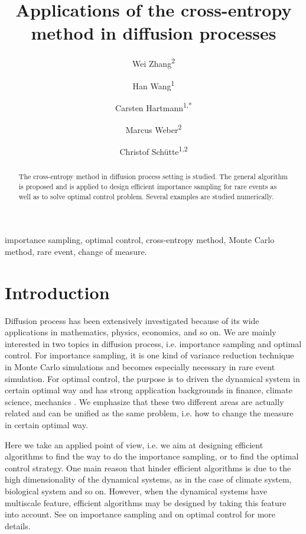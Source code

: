 \documentclass[final]{siamltex}
\begin{document}
\title{Applications of the cross-entropy method in diffusion processes}
\author{Wei Zhang\textsuperscript{2}\and Han Wang\textsuperscript{1} \and
  Carsten Hartmann\textsuperscript{1,*}\and 
Marcus Weber\textsuperscript{2}\and Christof Sch\"{u}tte\textsuperscript{1,2}}
\renewcommand{\thefootnote}{\fnsymbol{footnote}}
\date{}
\maketitle
\begin{abstract}
  The cross-entropy method in diffusion process setting is studied. The
  general algorithm is proposed and is applied to design efficient importance sampling for rare events as well as to solve optimal
  control problem. Several examples are studied numerically.
\end{abstract}
\begin{keywords}
importance sampling, optimal control, cross-entropy method, Monte Carlo
method, rare event, change of measure. 
\end{keywords}
\begin{AMS}
\end{AMS}
\section{Introduction}
\label{intro}
Diffusion process has been extensively investigated because of its wide
applications in mathematics, physics, economics, and so on.
We are mainly interested in two topics in diffusion process, i.e. importance sampling and optimal control. 
For importance sampling, it is one kind of variance reduction technique 
in Monte Carlo simulations and becomes especially necessary in rare event simulation.
For optimal control, the purpose is to driven the dynamical system in certain
optimal way and has strong application backgrounds in finance, climate
science, mechanics \cite{fleming2006}. We emphasize that these two different areas are actually related and can
be unified as the same problem, i.e. how to change the measure in certain optimal way.

Here we take an applied point of view, i.e. we aim at designing efficient
algorithms to find the way to do the importance sampling, or to find the
optimal control strategy. One main reason that hinder efficient algorithms is
due to the high dimensionality of the dynamical systems, as in the case of
climate system, biological system and so on. However, when the dynamical
systems have multiscale feature, efficient algorithms may be designed by
taking this feature into account. See \cite{ip-dupuis-multiscale, ip-eric,
zhws13} on importance sampling and \cite{control_schuette, zlph2013} on
optimal control for more details.
\end{document}
